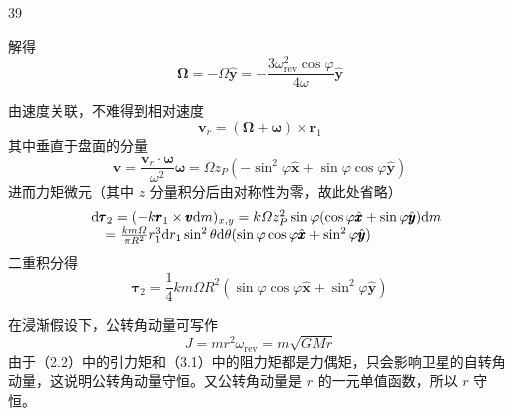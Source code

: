 \begin{solution}{39}
\begin{subsolution}
\begin{subsubsolution}
\begin{equation}
            \end{equation}
            解得
            \begin{equation}
                \pmb {\Omega} = - \varOmega \hat {\pmb {y}} = - \frac {3 \omega_ {\mathrm{rev}} ^ {2} \cos \varphi}{4 \omega} \hat {\pmb {y}}
                \label{eq:13.s39}
            \end{equation}
        \end{subsubsolution}
    \end{subsolution}
    \begin{subsolution}
        \begin{subsubsolution}
            由速度关联，不难得到相对速度
            \begin{equation}
                \boldsymbol {v} _ {r} = (\boldsymbol {\Omega} + \boldsymbol {\omega}) \times \boldsymbol {r} _ {1}
                \label{eq:14.s39}
            \end{equation}
            其中垂直于盘面的分量
            \begin{equation}
                \boldsymbol {v} = \frac {\boldsymbol {v} _ {r} \cdot \boldsymbol {\omega}}{\omega^ {2}} \boldsymbol {\omega} = \Omega z _ {P} (- \sin^ {2} \varphi \hat {\boldsymbol {x}} + \sin \varphi \cos \varphi \hat {\boldsymbol {y}})
                \label{eq:15.s39}
            \end{equation}
            进而力矩微元（其中 $z$ 分量积分后由对称性为零，故此处省略）
            \begin{equation}
                \begin{array}{r l} & {\mathrm{d} \pmb {\tau} _ {2} = (- k \pmb {r} _ {1} \times \pmb {v} \mathrm{d} m) _ {x, y} = k \varOmega z _ {P} ^ {2} \sin \varphi (\cos \varphi \hat {\pmb {x}} + \sin \varphi \hat {\pmb {y}}) \mathrm{d} m} \\ & {\quad = \frac {k m \varOmega}{\pi R ^ {2}} r _ {1} ^ {3} \mathrm{d} r _ {1} \sin^ {2} \theta \mathrm{d} \theta (\sin \varphi \cos \varphi \hat {\pmb {x}} + \sin^ {2} \varphi \hat {\pmb {y}})} \end{array}
                \label{eq:16.s39}
            \end{equation}
            二重积分得
            \begin{equation}
                \pmb {\tau} _ {2} = \frac {1}{4} k m \varOmega R ^ {2} (\sin \varphi \cos \varphi \hat {\pmb {x}} + \sin^ {2} \varphi \hat {\pmb {y}})
                \label{eq:17.s39}
            \end{equation}
        \end{subsubsolution}
        \begin{subsubsolution}
            在浸渐假设下，公转角动量可写作
            \begin{equation}
                J = m r ^ {2} \omega_ {\mathrm{rev}} = m \sqrt {G M r}
                \label{eq:18.s39}
            \end{equation}
            由于（2.2）中的引力矩和（3.1）中的阻力矩都是力偶矩，只会影响卫星的自转角动量，这说明公转角动量守恒。又公转角动量是 $r$ 的一元单值函数，所以 $r$ 守恒。


\end{subsubsolution}
\end{subsolution}
\end{solution}
